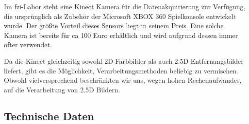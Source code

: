 Im \gls{fzi}-Labor steht eine Kinect Kamera für die Datenakquirierung zur
 Verfügung, die ursprünglich als Zubehör der Microsoft XBOX 360 Spielkonsole
 entwickelt wurde. Der größte Vorteil dieses Sensors liegt in seinem Preis. Eine
 solche Kamera ist bereits für ca 100 Euro erhältlich und wird aufgrund dessen
 immer öfter verwendet.
 
Da die Kinect gleichzeitig sowohl 2D Farbbilder als auch 2.5D Entfernungsbilder liefert, gibt es die Möglichkeit, Verarbeitungsmethoden beliebig zu vermischen.
 Obwohl vielversprechend beschränkten wir uns, wegen hohen Rechenaufwandes, auf
 die Verarbeitung von 2.5D Bildern.
\vspace{0.3cm}

\subsection{Technische Daten}
\label{kinect_umsetzung_technische_daten}
\authorsection{\editorhamza}

